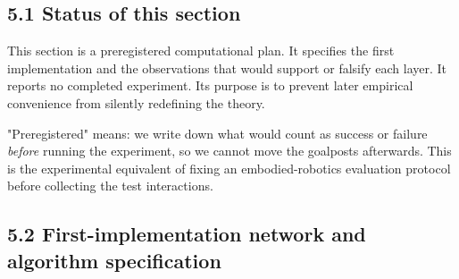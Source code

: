 \documentclass[11pt]{article}
\newenvironment{plainword}{%
  \par\medskip\noindent\begin{minipage}{\textwidth}%
  \color{gray!75!black}\small\itshape
}{%
  \end{minipage}\par\medskip}
\begin{document}
\subsection*{5.1 Status of this section}

This section is a preregistered computational plan. It specifies the first implementation and the observations that would support or
falsify each layer. It reports no completed experiment. Its purpose is to prevent later empirical convenience from silently
redefining the theory.

\begin{plainword}
"Preregistered" means: we write down what would count as success or failure \emph{before} running the experiment, so we cannot move
the goalposts afterwards. This is the experimental equivalent of fixing an embodied-robotics evaluation protocol before collecting
the test interactions.
\end{plainword}

\subsection*{5.2 First-implementation network and algorithm specification}
\end{document}
